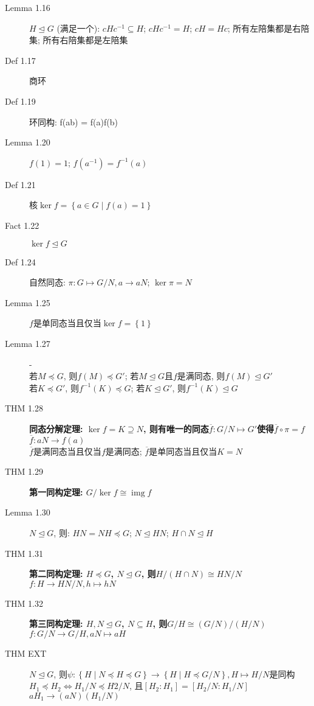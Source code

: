 \documentclass{article}
\renewcommand{\l}{\left}
\renewcommand{\r}{\right}
\newcommand{\img}{\operatorname{img}}
\begin{document}
\begin{description}
        \item[Lemma 1.16] $H \trianglelefteq G$ (满足一个): $cHc^{-1} \subseteq H$; $cHc^{-1} = H$; $cH = Hc$; 所有左陪集都是右陪集; 所有右陪集都是左陪集
        \item[Def 1.17] 商环
        \item[Def 1.19] 环同构: f(ab) = f(a)f(b)
        \item[Lemma 1.20] $f(1) = 1$; $f(a^{-1}) = f^{-1}(a)$
        \item[Def 1.21] 核$\ker f = \l\{ a \in G \mid f(a) = 1 \r\}$
        \item[Fact 1.22] $\ker f \trianglelefteq G$
        \item[Def 1.24] 自然同态: $\pi : G \mapsto G/N, a \to aN$; $\ker \pi = N$
        \item[Lemma 1.25] $f$是单同态当且仅当$\ker f = \l\{1\r\}$
        \item[Lemma 1.27] -\\
            若$M \preceq G$, 则$f(M) \preceq G'$; 若$M \trianglelefteq G$且$f$是满同态, 则$f(M) \trianglelefteq G'$\\
            若$K \preceq G'$, 则$f^{-1}(K) \preceq G$; 若$K \trianglelefteq G'$, 则$f^{-1}(K) \trianglelefteq G$
        \item[THM 1.28] \textbf{同态分解定理: $\ker f = K \supseteq N$, 则有唯一的同态$\overline{f} : G/N \mapsto G'$使得$\overline{f} \circ \pi = f$}\hfill$\overline{f} : aN \to f(a)$\\
            $\overline{f}$是满同态当且仅当$f$是满同态; $\overline{f}$是单同态当且仅当$K = N$
        \item[THM 1.29] \textbf{第一同构定理: $G/\ker f \cong \img f$}
        \item[Lemma 1.30] $N \trianglelefteq G$, 则: $HN = NH \preceq G$; $N \trianglelefteq HN$; $H \cap N \trianglelefteq H$
        \item[THM 1.31] \textbf{第二同构定理: $H \preceq G$, $N \trianglelefteq G$, 则$H/(H \cap N) \cong HN/N$}\hfill$f: H \to HN/N, h \mapsto hN$
        \item[THM 1.32] \textbf{第三同构定理: $H, N \trianglelefteq G$, $N \subseteq H$, 则$G/H \cong (G/N)/(H/N)$}\hfill$f: G/N \to G/H, aN \mapsto aH$
        \item[THM EXT] $N \trianglelefteq G$, 则$\psi: \l\{H \mid N \preceq H \preceq G\r\} \to \l\{H \mid H \preceq G/N\r\}, H \mapsto H/N$是同构\\
            $H_1 \preceq H_2 \iff H_1/N \preceq H2/N$, 且$[H_2 : H_1] = [H_2/N : H_1/N]$\hfill$aH_1 \to (aN)(H_1/N)$\\

\end{description}
\end{document}
